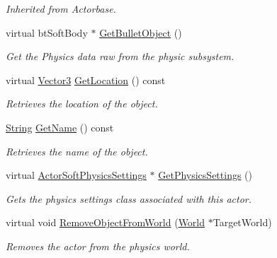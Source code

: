 \begin{DoxyCompactItemize}
\begin{DoxyCompactList}\small\item\em Inherited from Actorbase. \item\end{DoxyCompactList}\item 
virtual btSoftBody $\ast$ \hyperlink{classphys_1_1ActorSoft_a33b3fa2d6fcbb4e742e53fbde22f21a9}{GetBulletObject} ()
\begin{DoxyCompactList}\small\item\em Get the Physics data raw from the physic subsystem. \item\end{DoxyCompactList}\item 
virtual \hyperlink{classphys_1_1Vector3}{Vector3} \hyperlink{classphys_1_1ActorSoft_afdbd6ae49e3838190e5481796e650ce8}{GetLocation} () const 
\begin{DoxyCompactList}\small\item\em Retrieves the location of the object. \item\end{DoxyCompactList}\item 
\hyperlink{namespacephys_aa03900411993de7fbfec4789bc1d392e}{String} \hyperlink{classphys_1_1ActorSoft_a2b6bc680d900626275dc5eb3b631acca}{GetName} () const 
\begin{DoxyCompactList}\small\item\em Retrieves the name of the object. \item\end{DoxyCompactList}\item 
virtual \hyperlink{classphys_1_1ActorSoftPhysicsSettings}{ActorSoftPhysicsSettings} $\ast$ \hyperlink{classphys_1_1ActorSoft_a838160fd7c27302cc47291324eb62632}{GetPhysicsSettings} ()
\begin{DoxyCompactList}\small\item\em Gets the physics settings class associated with this actor. \item\end{DoxyCompactList}\item 
virtual void \hyperlink{classphys_1_1ActorSoft_ab65d106fcc1ee5243a990e7b42326bf0}{RemoveObjectFromWorld} (\hyperlink{classphys_1_1World}{World} $\ast$TargetWorld)
\begin{DoxyCompactList}\small\item\em Removes the actor from the physics world. \item\end{DoxyCompactList}\item 

\end{DoxyCompactItemize}
